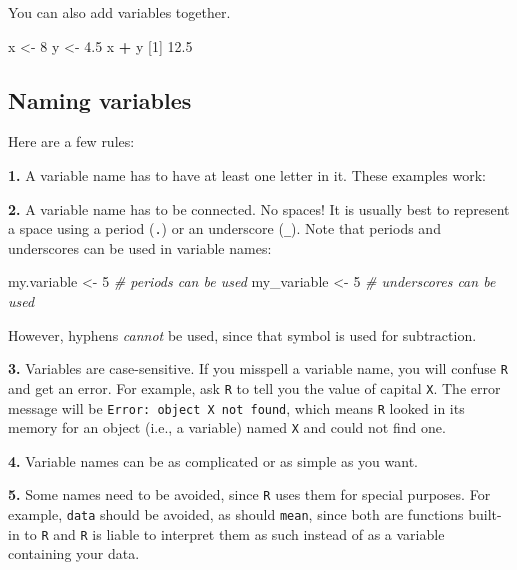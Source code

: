 \documentclass[
]{book}
\newenvironment{Shaded}{\begin{snugshade}}{\end{snugshade}}
\newcommand{\CommentTok}[1]{\textcolor[rgb]{0.56,0.35,0.01}{\textit{#1}}}
\newcommand{\DecValTok}[1]{\textcolor[rgb]{0.00,0.00,0.81}{#1}}
\newcommand{\FloatTok}[1]{\textcolor[rgb]{0.00,0.00,0.81}{#1}}
\newcommand{\NormalTok}[1]{#1}
\newcommand{\OperatorTok}[1]{\textcolor[rgb]{0.81,0.36,0.00}{\textbf{#1}}}
\newcommand{\StringTok}[1]{\textcolor[rgb]{0.31,0.60,0.02}{#1}}
\begin{document}
You can also add variables together.

\begin{Shaded}
\begin{Highlighting}[]
\NormalTok{x <-}\StringTok{ }\DecValTok{8}
\NormalTok{y <-}\StringTok{ }\FloatTok{4.5}
\NormalTok{x }\OperatorTok{+}\StringTok{ }\NormalTok{y}
\NormalTok{[}\DecValTok{1}\NormalTok{] }\FloatTok{12.5}
\end{Highlighting}
\end{Shaded}

\hypertarget{naming-variables}{%
\subsection*{Naming variables}\label{naming-variables}}

Here are a few rules:

\textbf{1.} A variable name has to have at least one letter in it. These examples work:

\textbf{2.} A variable name has to be connected. No spaces! It is usually best to represent a space using a period (\texttt{.}) or an underscore (\texttt{\_}). Note that periods and underscores can be used in variable names:

\begin{Shaded}
\begin{Highlighting}[]
\NormalTok{my.variable <-}\StringTok{ }\DecValTok{5} \CommentTok{# periods can be used}
\NormalTok{my_variable <-}\StringTok{ }\DecValTok{5} \CommentTok{# underscores can be used}
\end{Highlighting}
\end{Shaded}

However, hyphens \emph{cannot} be used, since that symbol is used for subtraction.

\textbf{3.} Variables are case-sensitive. If you misspell a variable name, you will confuse \texttt{R} and get an error. For example, ask \texttt{R} to tell you the value of capital \texttt{X}. The error message will be \texttt{Error:\ object\ \textquotesingle{}X\textquotesingle{}\ not\ found}, which means \texttt{R} looked in its memory for an object (i.e., a variable) named \texttt{X} and could not find one.

\textbf{4.} Variable names can be as complicated or as simple as you want.

\textbf{5.} Some names need to be avoided, since \texttt{R} uses them for special purposes. For example, \texttt{data} should be avoided, as should \texttt{mean}, since both are functions built-in to \texttt{R} and \texttt{R} is liable to interpret them as such instead of as a variable containing your data.
\end{document}
